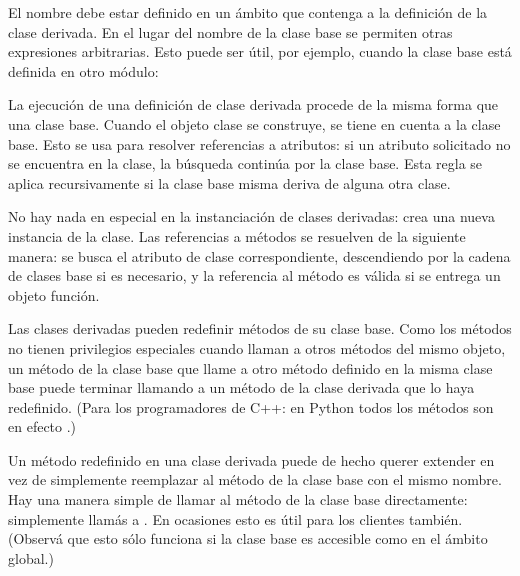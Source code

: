 \documentclass[a5paper,10pt,spanish]{sphinxmanual}
\begin{document}
\sphinxAtStartPar
El nombre  debe estar definido en un ámbito que contenga a la definición de la clase derivada.  En el lugar del nombre de la clase base se permiten otras expresiones arbitrarias.  Esto puede ser útil, por ejemplo, cuando la clase base está definida en otro módulo:

\begin{sphinxVerbatim}[commandchars=\\\{\}]
 
\end{sphinxVerbatim}

\sphinxAtStartPar
La ejecución de una definición de clase derivada procede de la misma forma que una clase base.  Cuando el objeto clase se construye, se tiene en cuenta a la clase base.  Esto se usa para resolver referencias a atributos: si un atributo solicitado no se encuentra en la clase, la búsqueda continúa por la clase base. Esta regla se aplica recursivamente si la clase base misma deriva de alguna otra clase.

\sphinxAtStartPar
No hay nada en especial en la instanciación de clases derivadas:  crea una nueva instancia de la clase.  Las referencias a métodos se resuelven de la siguiente manera: se busca el atributo de clase correspondiente, descendiendo por la cadena de clases base si es necesario, y la referencia al método es válida si se entrega un objeto función.

\sphinxAtStartPar
Las clases derivadas pueden redefinir métodos de su clase base.  Como los métodos no tienen privilegios especiales cuando llaman a otros métodos del mismo objeto, un método de la clase base que llame a otro método definido en la misma clase base puede terminar llamando a un método de la clase derivada que lo haya redefinido.  (Para los programadores de C++: en Python todos los métodos son en efecto .)

\sphinxAtStartPar
Un método redefinido en una clase derivada puede de hecho querer extender en vez de simplemente reemplazar al método de la clase base con el mismo nombre. Hay una manera simple de llamar al método de la clase base directamente: simplemente llamás a .  En ocasiones esto es útil para los clientes también.  (Observá que esto sólo funciona si la clase base es accesible como  en el ámbito global.)
\end{document}
